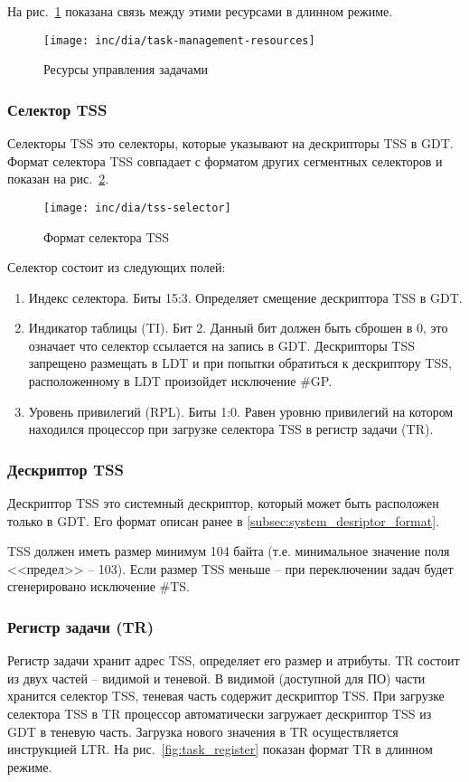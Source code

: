 На рис.~\ref{fig:task_management_resources} показана связь между этими ресурсами в длинном режиме.
\begin{figure}[ht!]
  \centering
  \texttt{[image: inc/dia/task-management-resources]}
  \caption{Ресурсы управления задачами}
  \label{fig:task_management_resources}
\end{figure}

\subsubsection*{Селектор TSS}
Селекторы TSS это селекторы, которые указывают на дескрипторы TSS в GDT.
Формат селектора TSS совпадает с форматом других сегментных селекторов и
показан на рис.~\ref{fig:tss_selector}.

\begin{figure}[ht!]
  \centering
  \texttt{[image: inc/dia/tss-selector]}
  \caption{Формат селектора TSS}
  \label{fig:tss_selector}
\end{figure}

Селектор состоит из следующих полей:
\begin{enumerate}[1.]
\item Индекс селектора. Биты 15:3. Определяет смещение дескриптора TSS в GDT.
\item Индикатор таблицы (TI). Бит 2. Данный бит должен быть сброшен в 0, это
	означает что селектор ссылается на запись в GDT. Дескрипторы TSS
	запрещено размещать в LDT и при попытки обратиться к дескриптору TSS,
	расположенному в LDT произойдет исключение \#GP.
\item Уровень привилегий (RPL). Биты 1:0. Равен уровню привилегий на котором
	находился процессор при загрузке селектора TSS в регистр задачи (TR).
\end{enumerate}

\subsubsection*{Дескриптор TSS}
Дескриптор TSS это системный дескриптор, который может быть расположен только
в GDT. Его формат описан ранее в \ref{subsec:system_desriptor_format}.

TSS должен иметь размер минимум 104 байта (т.е. минимальное значение поля <<предел>> -- 103).
Если размер TSS меньше -- при переключении задач будет сгенерировано исключение \#TS.

\subsubsection*{Регистр задачи (TR)}
Регистр задачи хранит адрес TSS, определяет его размер и атрибуты. TR состоит
из двух частей -- видимой и теневой. В видимой (доступной для ПО) части хранится селектор TSS,
теневая часть содержит дескриптор TSS. При загрузке селектора TSS в TR
процессор автоматически загружает дескриптор TSS из GDT в теневую часть.
Загрузка нового значения в TR осуществляется инструкцией LTR. На
рис.~\ref{fig:task_register} показан формат TR в длинном режиме.

